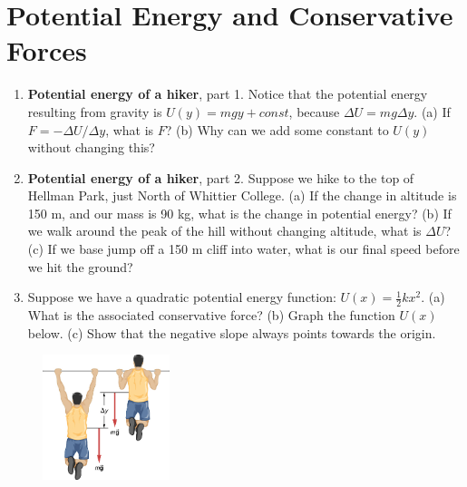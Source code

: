 \documentclass{article}
\begin{document}
\section{Potential Energy and Conservative Forces}

\begin{enumerate}
\item \textbf{Potential energy of a hiker}, part 1.  Notice that the potential energy resulting from gravity is $U(y) = mgy + const$, because $\Delta U = mg\Delta y$.  (a) If $F = -\Delta U/\Delta y$, what is $F$? (b) Why can we add some constant to $U(y)$ without changing this? \\ \vspace{0.5cm}
\item \textbf{Potential energy of a hiker}, part 2.  Suppose we hike to the top of Hellman Park, just North of Whittier College.  (a) If the change in altitude is 150 m, and our mass is 90 kg, what is the change in potential energy? (b) If we walk around the peak of the hill without changing altitude, what is $\Delta U$? (c) If we base jump off a 150 m cliff into water, what is our final speed before we hit the ground? \\ \vspace{2.5cm}
\item Suppose we have a quadratic potential energy function: $U(x) = \frac{1}{2}k x^2$. (a) What is the associated conservative force? (b) Graph the function $U(x)$ below. (c) Show that the negative slope always points towards the origin.
\end{enumerate}

\begin{figure}
\centering
\includegraphics[width=0.33\textwidth]{figures/pull_up.jpeg}
\caption{\label{fig:1}}
\end{figure}
\end{document}
